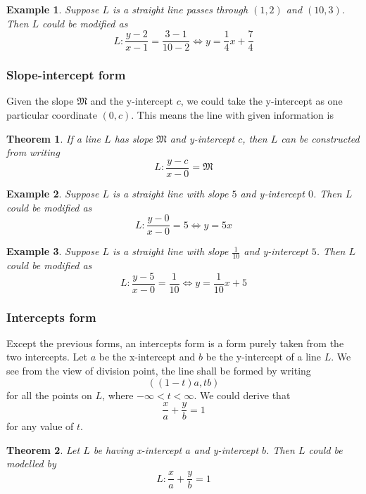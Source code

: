 \documentclass[12pt]{article}
\newtheorem*{theorem}{Theorem}
\newtheorem*{example}{Example}
\begin{document}
    \begin{example}
        Suppose $L$ is a straight line passes through $(1,2)$ and $(10,3)$. Then $L$ could be modified as $$L:\frac{y-2}{x-1}=\frac{3-1}{10-2}\iff y=\frac{1}{4}x+\frac{7}{4}$$
    \end{example}

    \subsubsection{Slope-intercept form}

    Given the slope $\mathfrak{M}$ and the y-intercept $c$, we could take the y-intercept as one particular coordinate $(0,c)$. This means the line with given information is 

    \begin{theorem}
        If a line $L$ has slope $\mathfrak{M}$ and y-intercept $c$, then $L$ can be constructed from writing $$L:\frac{y-c}{x-0}=\mathfrak{M}$$
    \end{theorem}

    \begin{example}
        Suppose $L$ is a straight line with slope $5$ and y-intercept $0$. Then $L$ could be modified as $$L:\frac{y-0}{x-0}=5\iff y=5x$$
    \end{example}
    
    \begin{example}
        Suppose $L$ is a straight line with slope $\frac{1}{10}$ and y-intercept $5$. Then $L$ could be modified as $$L:\frac{y-5}{x-0}=\frac{1}{10}\iff y=\frac{1}{10}x+5$$
    \end{example}

    \subsubsection{Intercepts form}

    Except the previous forms, an intercepts form is a form purely taken from the two intercepts. Let $a$ be the x-intercept and $b$ be the y-intercept of a line $L$. We see from the view of division point, the line shall be formed by writing $$((1-t)a, tb)$$ for all the points on $L$, where $-\infty<t<\infty$. We could derive that $$\frac{x}{a}+\frac{y}{b}=1$$ for any value of $t$.

    \begin{theorem}
        Let $L$ be having x-intercept $a$ and y-intercept $b$. Then $L$ could be modelled by $$L:\frac{x}{a}+\frac{y}{b}=1$$
    \end{theorem}
\end{document}
